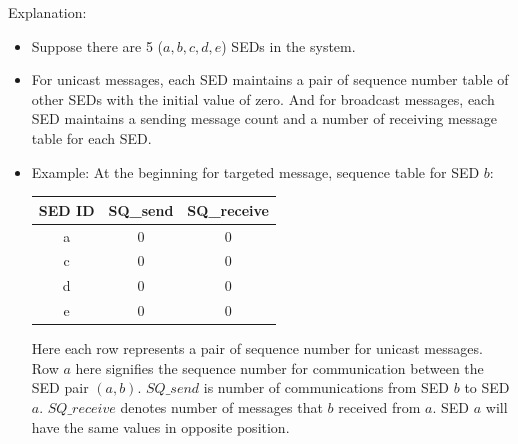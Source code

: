 \documentclass[11pt,oneside,onecolumn,letterpaper]{article}
\begin{document}
Explanation:
  \begin{itemize}
  \item Suppose there are 5 ($a, b, c, d, e$) SEDs in the system.
  \item For unicast messages, each SED maintains a pair of sequence number table of other SEDs with the initial value of zero. And for broadcast messages, each SED maintains a sending message count and a number of receiving message table for each SED.
  \item  Example: At the beginning for targeted message, sequence table for SED $b$:

    \begin{center}
  \begin{tabular}{ |c|c|c| } 
   \hline
  \textbf{SED ID} & \textbf{SQ\_send} & \textbf{SQ\_receive}\\
 	\hline \hline
 	a & 0 & 0 \\ 
	c & 0 & 0 \\ 
 	d & 0 & 0 \\ 
 	e & 0 & 0 \\ 
	 \hline
\end{tabular}
\end{center}
Here each row represents a pair of sequence number for unicast messages.
Row $a$ here signifies the sequence number for communication between the SED pair $(a,b)$. $SQ\_send$ is number of communications from SED $b$  to SED $a$. $SQ\_receive$ denotes number of messages that $b$ received from $a$. SED $a$ will have the same values in opposite position.


\end{itemize}
\end{document}
